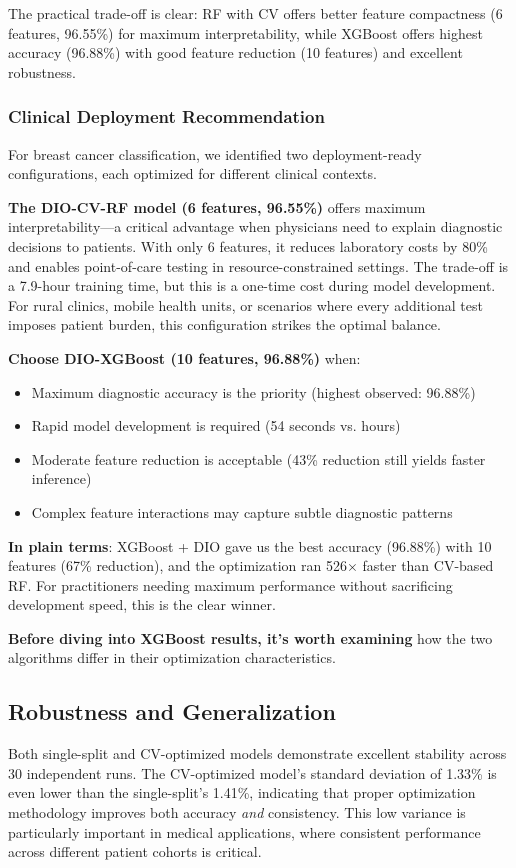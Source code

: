 \documentclass[12pt, a4paper]{article}
\begin{document}
The practical trade-off is clear: RF with CV offers better feature compactness (6 features, 96.55\%) for maximum interpretability, while XGBoost offers highest accuracy (96.88\%) with good feature reduction (10 features) and excellent robustness.

\subsubsection{Clinical Deployment Recommendation}
For breast cancer classification, we identified two deployment-ready configurations, each optimized for different clinical contexts.

\textbf{The DIO-CV-RF model (6 features, 96.55\%)} offers maximum interpretability—a critical advantage when physicians need to explain diagnostic decisions to patients. With only 6 features, it reduces laboratory costs by 80\% and enables point-of-care testing in resource-constrained settings. The trade-off is a 7.9-hour training time, but this is a one-time cost during model development. For rural clinics, mobile health units, or scenarios where every additional test imposes patient burden, this configuration strikes the optimal balance.

\textbf{Choose DIO-XGBoost (10 features, 96.88\%)} when:
\begin{itemize}
    \item Maximum diagnostic accuracy is the priority (highest observed: 96.88\%)
    \item Rapid model development is required (54 seconds vs. hours)
    \item Moderate feature reduction is acceptable (43\% reduction still yields faster inference)
    \item Complex feature interactions may capture subtle diagnostic patterns
\end{itemize}

\textbf{In plain terms}: XGBoost + DIO gave us the best accuracy (96.88\%) with 10 features (67\% reduction), and the optimization ran 526$\times$ faster than CV-based RF. For practitioners needing maximum performance without sacrificing development speed, this is the clear winner.

\textbf{Before diving into XGBoost results, it's worth examining} how the two algorithms differ in their optimization characteristics.

\subsection{Robustness and Generalization}
Both single-split and CV-optimized models demonstrate excellent stability across 30 independent runs. The CV-optimized model's standard deviation of 1.33\% is even lower than the single-split's 1.41\%, indicating that proper optimization methodology improves both accuracy \textit{and} consistency. This low variance is particularly important in medical applications, where consistent performance across different patient cohorts is critical.
\end{document}
